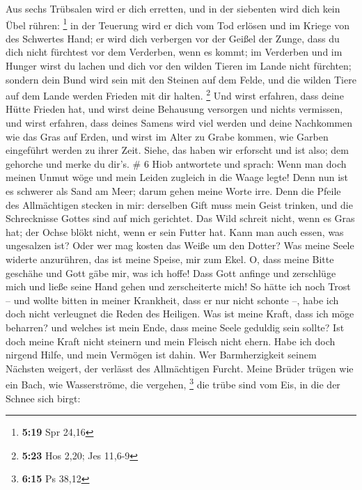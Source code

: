 Aus sechs Trübsalen wird er dich erretten, und in der siebenten wird
dich kein Übel rühren: \footnote{\textbf{5:19} Spr 24,16} 
in der Teuerung wird er dich vom Tod erlösen und im Kriege von des
Schwertes Hand;  er wird dich verbergen vor der Geißel der
Zunge, dass du dich nicht fürchtest vor dem Verderben, wenn es kommt;
 im Verderben und im Hunger wirst du lachen und dich vor
den wilden Tieren im Lande nicht fürchten;  sondern dein
Bund wird sein mit den Steinen auf dem Felde, und die wilden Tiere auf
dem Lande werden Frieden mit dir halten. \footnote{\textbf{5:23} Hos
  2,20; Jes 11,6-9}  Und wirst erfahren, dass deine Hütte
Frieden hat, und wirst deine Behausung versorgen und nichts vermissen,
 und wirst erfahren, dass deines Samens wird viel werden
und deine Nachkommen wie das Gras auf Erden,  und wirst im
Alter zu Grabe kommen, wie Garben eingeführt werden zu ihrer Zeit.
 Siehe, das haben wir erforscht und ist also; dem gehorche
und merke du dir's. \# 6  Hiob antwortete und sprach:
 Wenn man doch meinen Unmut wöge und mein Leiden zugleich in
die Waage legte!  Denn nun ist es schwerer als Sand am Meer;
darum gehen meine Worte irre.  Denn die Pfeile des
Allmächtigen stecken in mir: derselben Gift muss mein Geist trinken, und
die Schrecknisse Gottes sind auf mich gerichtet.  Das Wild
schreit nicht, wenn es Gras hat; der Ochse blökt nicht, wenn er sein
Futter hat.  Kann man auch essen, was ungesalzen ist? Oder
wer mag kosten das Weiße um den Dotter?  Was meine Seele
widerte anzurühren, das ist meine Speise, mir zum Ekel.  O,
dass meine Bitte geschähe und Gott gäbe mir, was ich hoffe! 
Dass Gott anfinge und zerschlüge mich und ließe seine Hand gehen und
zerscheiterte mich!  So hätte ich noch Trost -- und wollte
bitten in meiner Krankheit, dass er nur nicht schonte --, habe ich doch
nicht verleugnet die Reden des Heiligen.  Was ist meine
Kraft, dass ich möge beharren? und welches ist mein Ende, dass meine
Seele geduldig sein sollte?  Ist doch meine Kraft nicht
steinern und mein Fleisch nicht ehern.  Habe ich doch
nirgend Hilfe, und mein Vermögen ist dahin.  Wer
Barmherzigkeit seinem Nächsten weigert, der verlässt des Allmächtigen
Furcht.  Meine Brüder trügen wie ein Bach, wie
Wasserströme, die vergehen, \footnote{\textbf{6:15} Ps 38,12}
 die trübe sind vom Eis, in die der Schnee sich birgt:
